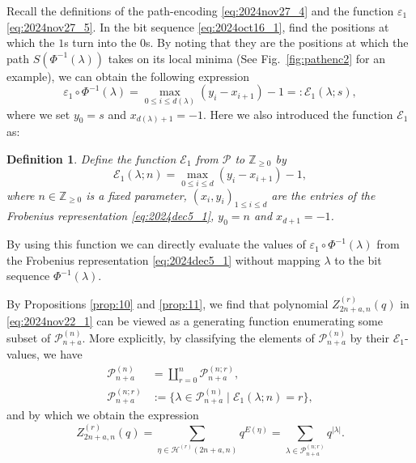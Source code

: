 \documentclass[sn-mathphys-num]{sn-jnl}%
\theoremstyle{thmstyleone}%
\theoremstyle{thmstyletwo}%
\theoremstyle{thmstylethree}%
\newtheorem{definition}{Definition}%
\begin{document}
Recall the definitions of the path-encoding \eqref{eq:2024nov27_4}
and the function $\varepsilon_1$ \eqref{eq:2024nov27_5}.
In the bit sequence \eqref{eq:2024oct16_1},
find the positions at which the $1$s turn into the $0$s.
By noting that they are the positions at which the path $S(\Phi^{-1}(\lambda))$ 
takes on its local minima (See Fig.~\ref{fig:pathenc2} for an example),
we can obtain the following expression
\begin{equation*}
\varepsilon_1 \circ \Phi^{-1}(\lambda) = \max_{0 \leq i \leq d(\lambda)} (y_i -x_{i+1}) -1
=: \mathcal{E}_1 (\lambda; s),
\end{equation*}
where we set $y_0 = s$ and $x_{d(\lambda)+1}=-1$.
Here we also introduced the function $\mathcal{E}_1$ as:
\begin{definition}
Define the function $\mathcal{E}_1$
from $\mathscr{P}$ to $\mathbb{Z}_{\geq 0}$ by
\begin{equation}\label{eq:2024nov27_6}
\mathcal{E}_1 (\lambda; n) =  \max_{0 \leq i \leq d} (y_i -x_{i+1}) -1,
\end{equation}
where $n \in \mathbb{Z}_{\geq 0}$ is a fixed parameter,
$( x_i, y_i )_{1 \leq i \leq d}$ are the entries of the Frobenius representation \eqref{eq:2024dec5_1},
$y_0 = n$ and $x_{d+1}=-1$.
\end{definition}
By using this function we can directly evaluate the values of $\varepsilon_1 \circ \Phi^{-1}(\lambda)$ 
from the Frobenius representation \eqref{eq:2024dec5_1} without 
mapping $\lambda$ to the bit sequence $\Phi^{-1}(\lambda)$.



By Propositions \ref{prop:10} and \ref{prop:11},
we find that polynomial $Z_{2n+a,n}^{(r)}(q)$ in \eqref{eq:2024nov22_1}
can be viewed as a generating function enumerating
some subset of $\mathscr{P}^{(n)}_{n+a}$.
More explicitly, 
by classifying the elements of $\mathscr{P}^{(n)}_{n+a}$ by their $\mathcal{E}_1$-values,
we have
\begin{align}
\mathscr{P}^{(n)}_{n+a} &= \coprod_{r = 0}^n \mathscr{P}^{(n;r)}_{n+a}, \nonumber \\
\mathscr{P}^{(n;r)}_{n+a}  &:= \{ \lambda \in \mathscr{P}^{(n)}_{n+a} \mid 
\mathcal{E}_1 (\lambda; n) = r \}, \label{eq:2024dec6_2}
\end{align}
and by which we obtain the expression
\begin{equation}\label{eq:2024dec6_5}
Z_{2n+a,n}^{(r)}(q)=
\sum_{\eta \in \mathcal{H}^{(r)} (2n+a,n)} q^{E(\eta)}
 = \sum_{\lambda \in \mathscr{P}^{(n;r)}_{n+a} }
q^{|\lambda|}.
\end{equation}
\end{document}
